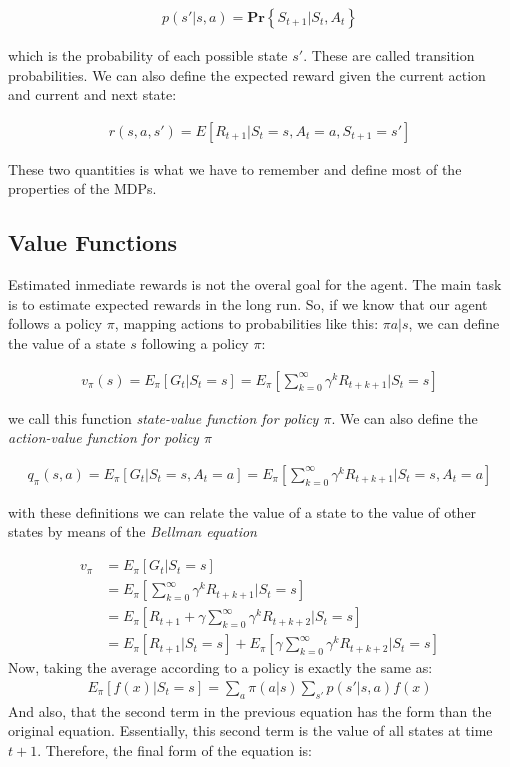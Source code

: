 \documentclass{article}
\begin{document}
\begin{align}
p(s' | s, a) = \mathbf{Pr}\left\{S_{t+1} | S_t, A_t \right\} 
\end{align}

which is the probability of each possible state $s'$. These are called transition probabilities. We can also define the expected reward given the current action and current and next state:

\begin{align}
r(s, a, s') = E \left[ R_{t+1} | S_t = s, A_t = a, S_{t+1} = s' \right]
\end{align}

These two quantities is what we have to remember and define most of the properties of the MDPs.

\subsection{Value Functions}

Estimated inmediate rewards is not the overal goal for the agent. The main task is to estimate expected rewards in the long run. So, if we know that our agent follows a policy $\pi$, mapping actions to probabilities like this: $\pi{a|s}$, we can define the value of a state $s$ following a policy $\pi$:

\begin{align}
v_{\pi}(s) = E_{\pi}\left[ G_t | S_t = s \right] = E_{\pi}\left[\sum_{k=0}^{\infty} \gamma^k R_{t+k+1} | S_t = s \right]
\end{align}

we call this function \emph{state-value function for policy $\pi$}. We can also define the \emph{action-value function for policy $\pi$}

\begin{align}
q_{\pi}(s, a) = E_{\pi}\left[ G_t | S_t = s , A_t = a \right] = E_{\pi}\left[\sum_{k=0}^{\infty} \gamma^k R_{t+k+1} | S_t = s, A_t = a \right]
\end{align}

with these definitions we can relate the value of a state to the value of other states by means of the \emph{Bellman equation}

\begin{align}
v_{\pi} &= E_{\pi}\left[G_t | S_t = s \right] \\
&= E_{\pi}\left[\sum_{k=0}^{\infty} \gamma^k R_{t+k+1} | S_t = s \right] \\
&= E_{\pi}\left[R_{t+1} + \gamma \sum_{k=0}^{\infty} \gamma^k R_{t+k+2} | S_t = s \right] \\
&= E_{\pi}\left[R_{t+1}|S_t=s\right] + E_{\pi}\left[\gamma \sum_{k=0}^{\infty} \gamma^k R_{t+k+2} | S_t = s \right]
\end{align}
Now, taking the average according to a policy is exactly the same as:
\begin{align}
E_{\pi}\left[f(x) | S_t = s \right] = \sum_{a}\pi(a|s) \sum_{s'} p(s' | s,a) f(x)
\label{eq:bellman}
\end{align}
And also, that the second term in the previous equation has the form than the original equation. Essentially, this second term is the value of all states at time $t+1$. Therefore, the final form of the equation is:
\end{document}
